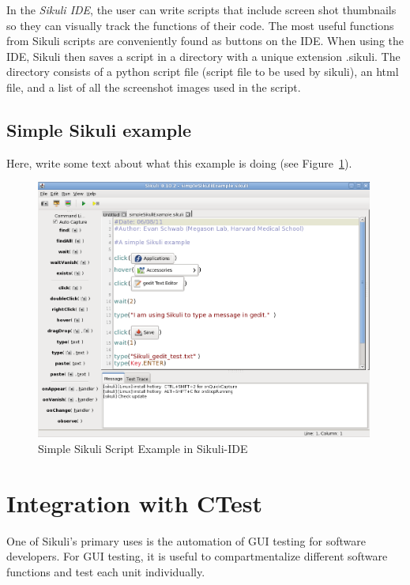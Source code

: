 \documentclass{InsightArticle}
\begin{document}
In the \emph{Sikuli IDE}, the user can write scripts that include screen shot
thumbnails so they can visually track the functions of their code. The most
useful functions from Sikuli scripts are conveniently found as
buttons on the IDE. When using the IDE, Sikuli then saves a script in a
directory with a unique extension .sikuli. The directory consists of a python
script file (script file to be used by sikuli), an html file, and a list of all
the screenshot images used in the script.


\subsection{Simple Sikuli example} %

Here, write some text about what this example is doing
(see Figure~\ref{fig:SimpleExample}).

\begin{figure}[htbp]
 \centering
 \includegraphics[width=0.99\textwidth]{Images/SimpleSikuliExample.png}
 \caption{Simple Sikuli Script Example in Sikuli-IDE}
 \label{fig:SimpleExample}
\end{figure}

\section{Integration with CTest}

One of Sikuli's primary uses is the automation of GUI testing for software
developers. For GUI testing, it is useful to compartmentalize different software
functions and test each unit individually.\\
\end{document}
